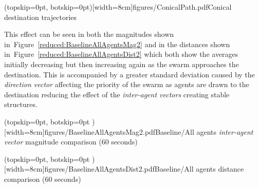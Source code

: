 \documentclass{ieeeaccess}
\begin{document}
\Figure[t!](topskip=0pt, botskip=0pt)[width=8cm]{figures/ConicalPath.pdf}{Conical destination trajectories\label{reduced:ConicalPath}}

This effect can be seen in both the magnitudes shown in~Figure~\ref{reduced:BaselineAllAgentsMag2} and in the distances shown in~Figure~\ref{reduced:BaselineAllAgentsDist2} which both show the averages initially decreasing but then increasing again as the swarm approaches the destination. This is accompanied by a greater standard deviation caused by the \textit{direction vector} affecting the priority of the swarm as agents are drawn to the destination reducing the effect of the \textit{inter-agent vectors} creating stable structures.

\Figure[t!](topskip=0pt, botskip=0pt )[width=8cm]{figures/BaselineAllAgentsMag2.pdf}{Baseline/All agents \textit{inter-agent vector} magnitude comparison (60 seconds)\label{reduced:BaselineAllAgentsMag2}}


\Figure[t!](topskip=0pt, botskip=0pt )[width=8cm]{figures/BaselineAllAgentsDist2.pdf}{Baseline/All agents distance comparison (60 seconds)\label{reduced:BaselineAllAgentsDist2}}
\end{document}
